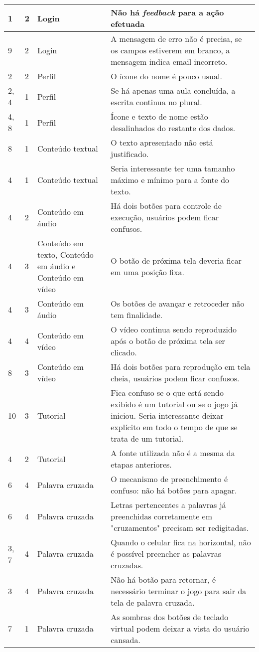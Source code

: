 \begin{table}[H]
\begin{tabular}{p{1.5cm} p{2cm} p{4cm} p{8.5cm}}
1
& 
2
&
Login
&
Não há \textit{feedback} para a ação efetuada
\\ \midrule
9
& 
2
&
Login
&
A mensagem de erro não é precisa, se os campos estiverem em branco, a mensagem indica email incorreto.
\\ \midrule
2
& 
2
&
Perfil
&
O ícone do nome é pouco usual.
\\ \midrule
2, 4
& 
1
&
Perfil
&
Se há apenas uma aula concluída, a escrita continua no plural.
\\ \midrule
4, 8
& 
1
&
Perfil
&
Ícone e texto de nome estão desalinhados do restante dos dados.
\\ \midrule
8
& 
1
&
Conteúdo textual
&
O texto apresentado não está justificado.
\\ \midrule
4
& 
1
&
Conteúdo textual
&
Seria interessante ter uma tamanho máximo e mínimo para a fonte do texto.
\\ \midrule
4
& 
2
&
Conteúdo em áudio
&
Há dois botões para controle de execução, usuários podem ficar confusos.
\\ \midrule
4
& 
3
&
Conteúdo em texto, Conteúdo em áudio e Conteúdo em vídeo
&
O botão de próxima tela deveria ficar em uma posição fixa.
\\ \midrule
4
& 
3
&
Conteúdo em áudio
&
Os botões de avançar e retroceder não tem finalidade.
\\ \midrule
4
& 
4
&
Conteúdo em vídeo
&
O vídeo continua sendo reproduzido após o botão de próxima tela ser clicado.
\\ \midrule
8
& 
3
&
Conteúdo em vídeo
&
Há dois botões para reprodução em tela cheia, usuários podem ficar confusos.
\\ \midrule
10
& 
3
&
Tutorial
&
Fica confuso se o que está sendo exibido é um tutorial ou se o jogo já iniciou. Seria interessante deixar explícito em todo o tempo de que se trata de um tutorial.
\\ \midrule
4
& 
2
&
Tutorial
&
A fonte utilizada não é a mesma da etapas anteriores.
\\ \midrule
6
& 
4
&
Palavra cruzada
&
O mecanismo de preenchimento é confuso: não há botões para apagar.
\\ \midrule
6
& 
4
&
Palavra cruzada
&
Letras pertencentes a palavras já preenchidas corretamente em "cruzamentos" precisam ser redigitadas.
\\ \midrule
3, 7
& 
4
&
Palavra cruzada
&
Quando o celular fica na horizontal, não é possível preencher as palavras cruzadas.
\\ \midrule
3
& 
4
&
Palavra cruzada
&
Não há botão para retornar, é necessário terminar o jogo para sair da tela de palavra cruzada.
\\ \midrule
7
& 
1
&
Palavra cruzada
&
As sombras dos botões de teclado virtual podem deixar a vista do usuário cansada.
\\ \bottomrule

\end{tabular}
\label{tab:avaliacaonielsen}
\end{table}
\endgroup
